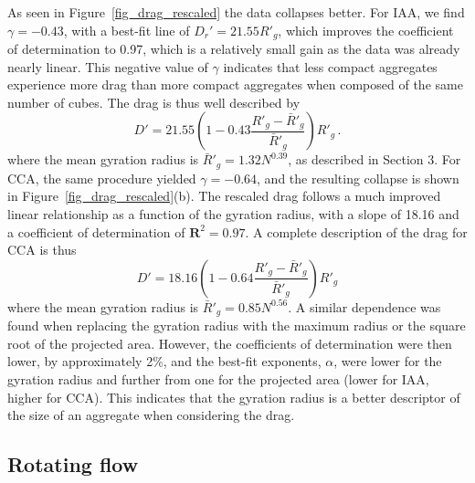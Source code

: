 As seen in Figure~\ref{fig_drag_rescaled} the data collapses better. For IAA, we find $\gamma = -0.43$, with a best-fit line of  $D_r' = 21.55 R'_g$, which improves the coefficient of determination to 0.97, which is a relatively small gain as the data was already nearly linear. This negative value of $\gamma$ indicates that less compact aggregates experience more drag than more compact aggregates when composed of the same number of cubes.
The drag is thus well described by
\begin{equation}
D' = 21.55 \left(1 - 0.43  \frac{R'_g - \bar{R}'_g}{\bar{R}'_g}\right )  R'_g \, . 
\label{eq_drag_rescaledIAA}
\end{equation}
where the mean gyration radius is $\bar{R}'_g = 1.32N^{0.39}$, as described in Section 3.
For CCA,  the same procedure yielded $\gamma = -0.64$, and the resulting collapse is shown in Figure~\ref{fig_drag_rescaled}(b).
The rescaled drag follows a much improved linear relationship as a function of the gyration radius, with a slope of 18.16 and a coefficient of determination of $\mathbf{R}^2=0.97$. A complete description of the drag for CCA is thus
\begin{equation}
D' = 18.16 \left(1 -0.64  \frac{R'_g - \bar{R}'_g}{\bar{R}'_g}\right) R'_g
\label{eq_drag_rescaledCCA}
\end{equation}
where the mean gyration radius is $\bar{R}'_g = 0.85N^{0.56}$.  
A similar dependence was found when replacing the gyration radius with the maximum radius or the square root of the projected area. However, the coefficients of determination were then lower, by approximately 2\%, and the best-fit exponents, $\alpha$, were lower for the gyration radius and further from one for the projected area (lower for IAA, higher for CCA). This indicates that the gyration radius is a better descriptor of the size of an aggregate when considering the drag.

\subsection{Rotating flow}

